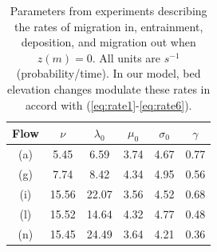 \documentclass[draft]{agujournal2018}
\begin{document}
\begin{table}[h]%
	\centering
	\caption{Parameters from \citet{Ancey2008} experiments describing the rates of migration in, entrainment, deposition, and migration out when $z(m)=0$. All units are $s^{-1}$ (probability/time). In our model, bed elevation changes modulate these rates in accord with (\ref{eq:rate1}-\ref{eq:rate6}).}\label{tab:anceyparams}
	\begin{tabular}{cccccc} \\ 
		\toprule  
		Flow & $\nu$ & $\lambda_0$ & $\mu_0$ & $\sigma_0$ & $\gamma$ \\
		\midrule
		(a) & 5.45  & 6.59  & 3.74 & 4.67 & 0.77 \\
		\midrule
		(g) & 7.74  & 8.42  & 4.34 & 4.95 & 0.56 \\
		\midrule
		(i) & 15.56 & 22.07 & 3.56 & 4.52 & 0.68 \\
		\midrule
		(l) & 15.52 & 14.64 & 4.32 & 4.77 & 0.48 \\
		\midrule
		(n) & 15.45 & 24.49 & 3.64 & 4.21 & 0.36 \\
		\bottomrule
	\end{tabular}
\end{table} 
\end{document}
